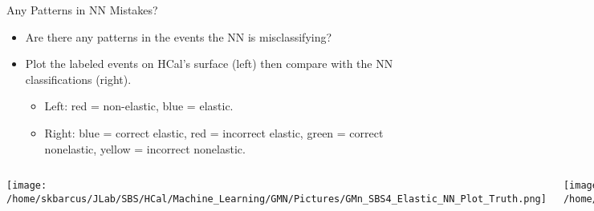 \documentclass[10pt]{beamer}
\begin{document}
\begin{frame}{Any Patterns in NN Mistakes?}

	\begin{itemize}
		\item Are there any patterns in the events the NN is misclassifying?
		\item Plot the labeled events on HCal's surface (left) then compare with the NN classifications (right).
			\begin{itemize}
				\item[--] Left: \alert{red = non-elastic}, \alert{blue = elastic}.
				\item[--] Right: \alert{blue = correct elastic}, \alert{red = incorrect elastic}, \alert{green = correct nonelastic}, \alert{yellow = incorrect nonelastic}.
			\end{itemize}
	\end{itemize}
	
	\vspace{-7mm}
	\begin{columns}[T,onlytextwidth]
	
	\begin{center}
    		\texttt{[image: /home/skbarcus/JLab/SBS/HCal/Machine\_Learning/GMN/Pictures/GMn\_SBS4\_Elastic\_NN\_Plot\_Truth.png]}
    	\end{center}
    	
    	
    	\begin{center}
    		\texttt{[image: /home/skbarcus/JLab/SBS/HCal/Machine\_Learning/GMN/Pictures/GMn\_SBS4\_Elastic\_NN\_Plot\_Predicted.png]}
    	\end{center}
    	
    	\end{columns}

\end{frame}
\end{document}
